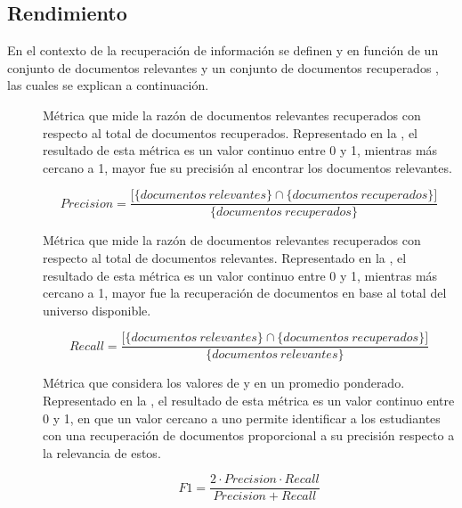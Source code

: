 \subsection{Rendimiento}
\label{subsec:rendimiento}
En el contexto de la recuperación de información se definen  y  en función de un conjunto de documentos relevantes y un conjunto de documentos recuperados \parencite[p.~38]{powers2011evaluation}, las cuales se explican a continuación.  

\begin{description}
	\item [] Métrica que mide la razón de documentos relevantes recuperados con 
respecto al total de documentos recuperados. Representado en la , el resultado de esta métrica es un valor continuo entre 0 y 1, mientras más cercano a 1, mayor fue su precisión al encontrar los documentos relevantes.

	\begin{equation}
	Precision = \frac{\big[\big\{documentos \ relevantes\big\} \cap \big\{documentos \ recuperados\big\}\big]}{\big\{documentos \ recuperados\big\}}
	\label{eq:precision}
	\end{equation}

	\item [] Métrica que mide la razón de documentos relevantes recuperados con 
respecto al total de documentos relevantes. Representado en la , el resultado de esta métrica es un valor continuo entre 0 y 1, mientras más cercano a 1, mayor fue la recuperación de documentos en base al total del universo disponible.

	\begin{equation}
	Recall = \frac{\big[\big\{documentos \ relevantes\big\} \cap \big\{documentos \ recuperados\big\}\big]}{\big\{documentos \ relevantes\big\}}
	\label{eq:recall}
	\end{equation}

	\item [] Métrica que considera los valores de  y  en un promedio ponderado. Representado en la , el resultado de esta métrica es un valor continuo entre 0 y 1, en que un valor cercano a uno permite identificar a los estudiantes con una recuperación de documentos proporcional a su precisión respecto a la relevancia de estos.  

	\begin{equation}
	F1 = \frac{2 \cdot Precision\cdot Recall}{Precision+ Recall}
	\label{eq:F1}
	\end{equation}
 
\end{description}

